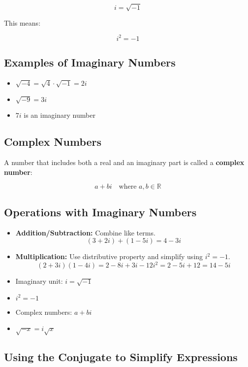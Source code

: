 \documentclass[11pt]{article}
\begin{document}
\[
i = \sqrt{-1}
\]

This means:

\[
i^2 = -1
\]

\subsection{Examples of Imaginary Numbers}
\begin{itemize}
  \item \( \sqrt{-4} = \sqrt{4} \cdot \sqrt{-1} = 2i \)
  \item \( \sqrt{-9} = 3i \)
  \item \( 7i \) is an imaginary number
\end{itemize}

\subsection{Complex Numbers}
A number that includes both a real and an imaginary part is called a \textbf{complex number}:

\[
a + bi \quad \text{where } a, b \in \mathbb{R}
\]

\subsection{Operations with Imaginary Numbers}
\begin{itemize}
  \item \textbf{Addition/Subtraction:} Combine like terms.
    \[
    (3 + 2i) + (1 - 5i) = 4 - 3i
    \]
  \item \textbf{Multiplication:} Use distributive property and simplify using \( i^2 = -1 \).
    \[
    (2 + 3i)(1 - 4i) = 2 - 8i + 3i - 12i^2 = 2 - 5i + 12 = 14 - 5i
    \]
\end{itemize}

\begin{tcolorbox}[colback=cyan!5!white, colframe=cyan!80!black, title=Summary]
\begin{itemize}
  \item Imaginary unit: \( i = \sqrt{-1} \)
  \item \( i^2 = -1 \)
  \item Complex numbers: \( a + bi \)
  \item \( \sqrt{-x} = i\sqrt{x} \)
\end{itemize}
\end{tcolorbox}

\subsection{Using the Conjugate to Simplify Expressions}
\end{document}
